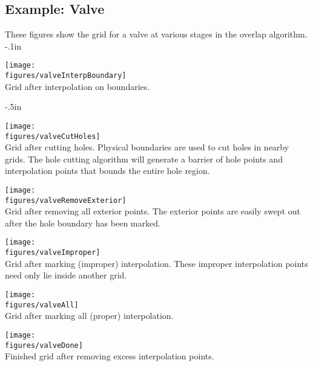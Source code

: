 \vfill\eject
\subsection{Example: Valve}

These figures show the grid for a valve at various stages in the overlap algorithm.
\vglue-.1in
\begin{center}
 \texttt{[image: \\figures/valveInterpBoundary]}\\
 {Grid after interpolation on boundaries.}
\end{center}
\vglue-.5in
\begin{center}
 \texttt{[image: \\figures/valveCutHoles]}\\
 {Grid after cutting holes. Physical boundaries are used to cut
      holes in nearby grids. The hole cutting algorithm will generate a barrier of hole points and
      interpolation points that bounds the entire hole region.}
\end{center}
\begin{center}
   \texttt{[image: \\figures/valveRemoveExterior]}\\
 {Grid after removing all exterior points. The exterior points are easily swept out
      after the hole boundary has been marked.}
  \end{center}
  \begin{center}
   \texttt{[image: \\figures/valveImproper]}\\
  {Grid after marking (improper) interpolation. These improper interpolation points need only lie
    inside another grid.}
  \end{center}
  \begin{center}
   \texttt{[image: \\figures/valveAll]}\\
  {Grid after marking all (proper) interpolation.}
  \end{center}
  \begin{center}
   \texttt{[image: \\figures/valveDone]}\\
  {Finished grid after removing excess interpolation points.}
  \end{center}


